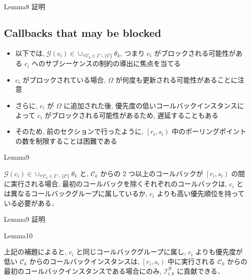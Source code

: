 \begin{frame}{Lemma8 証明}
    \todo{}
\end{frame}


\subsection{Callbacks that may be blocked}
\label{ssec: callbacks_that_may_be_blocked}

\begin{frame}{}
    \begin{itemize}
        \item 以下では, $\mathcal{G}\left(c_{i}\right) \in \cup_{\forall \mathcal{C}_{k} \in \Gamma \backslash\{\mathcal{C}\}} \theta_{k}$, つまり $c_{i}$ がブロックされる可能性がある $c_{i}$ へのサブシーケンスの制約の導出に焦点を当てる
        \item $c_{i}$ がブロックされている場合, $\Omega$ が何度も更新される可能性があることに注意
        \item さらに, $c_{i}$ が $\Omega$ に追加された後, 優先度の低いコールバックインスタンスによって $c_{i}$ がブロックされる可能性があるため, 遅延することもある
        \item そのため, 前のセクションで行ったように, $\left[r_{i}, s_{i}\right)$ 中のポーリングポイントの数を制限することは困難である
    \end{itemize}
\end{frame}

\begin{frame}{Lemma9}
    \begin{lemma}[]
        $\mathcal{G}\left(c_{i}\right) \in \cup_{\forall \mathcal{C}_{k} \in \Gamma \backslash\{\mathcal{C}\}} \theta_{k}$ と, $\mathcal{C}_{k}$ からの 2 つ以上のコールバックが $\left[r_{i}, s_{i}\right)$ の間に実行される場合, 最初のコールバックを除くそれぞれのコールバックは, $c_{i}$ とは異なるコールバックグループに属しているか, $c_{i}$ よりも高い優先順位を持っている必要がある．
    \end{lemma}
\end{frame}

\begin{frame}{Lemma9 証明}
    \todo{}
\end{frame}

\begin{frame}{Lemma10}
    \begin{lemma}[]
        上記の補題によると, $c_{i}$ と同じコールバックグループに属し, $c_{i}$ よりも優先度が低い $\mathcal{C}_{k}$ からのコールバックインスタンスは, $\left[r_{i}, s_{i}\right)$ 中に実行される $\mathcal{C}_{k}$ からの最初のコールバックインスタンスである場合にのみ, $\mathcal{I}_{i, k}^{\mathcal{B}}$ に貢献できる．
    \end{lemma}
\end{frame}



